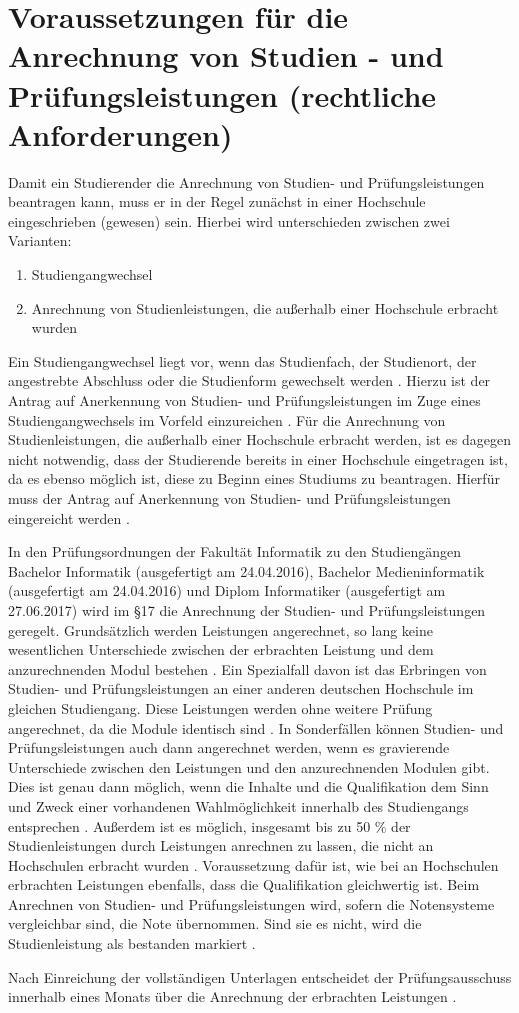 \section{Voraussetzungen für die Anrechnung von Studien - und Prüfungsleistungen (rechtliche Anforderungen)}

Damit ein Studierender die Anrechnung von Studien- und Prüfungsleistungen beantragen kann, muss er in der Regel zunächst in einer Hochschule eingeschrieben (gewesen) sein. Hierbei wird unterschieden zwischen zwei Varianten:

\begin{enumerate}
\item Studiengangwechsel
\item Anrechnung von Studienleistungen, die außerhalb einer Hochschule erbracht wurden
\end{enumerate}


Ein Studiengangwechsel liegt vor, wenn das Studienfach, der Studienort, der angestrebte Abschluss oder die Studienform gewechselt werden \parencite{studiengangwechsel}. Hierzu ist der Antrag auf Anerkennung von Studien- und Prüfungsleistungen im Zuge eines Studiengangwechsels im Vorfeld einzureichen \parencite{antrag_anrechnung_wechsel}.
Für die Anrechnung von Studienleistungen, die außerhalb einer Hochschule erbracht werden, ist es dagegen nicht notwendig, dass der Studierende bereits in einer Hochschule eingetragen ist, da es ebenso möglich ist, diese zu Beginn eines Studiums zu beantragen. Hierfür muss der Antrag auf Anerkennung von Studien- und Prüfungsleistungen eingereicht werden \parencite{antrag_anrechnung}.

In den Prüfungsordnungen der Fakultät Informatik zu den Studiengängen Bachelor Informatik (ausgefertigt am 24.04.2016), Bachelor Medieninformatik (ausgefertigt am 24.04.2016) und Diplom Informatiker (ausgefertigt am 27.06.2017) wird im §17 die Anrechnung der Studien- und Prüfungsleistungen geregelt.
Grundsätzlich werden Leistungen angerechnet, so lang keine wesentlichen Unterschiede zwischen der erbrachten Leistung und dem anzurechnenden Modul bestehen \parencite{pruefungsordnung_ba}. Ein Spezialfall davon ist das Erbringen von Studien- und Prüfungsleistungen an einer anderen deutschen Hochschule im gleichen Studiengang. Diese Leistungen werden ohne weitere Prüfung angerechnet, da die Module identisch sind \parencite{pruefungsordnung_ba}. In Sonderfällen können Studien- und Prüfungsleistungen auch dann angerechnet werden, wenn es gravierende Unterschiede zwischen den Leistungen und den anzurechnenden Modulen gibt. Dies ist genau dann möglich, wenn die Inhalte und die Qualifikation dem Sinn und Zweck einer vorhandenen Wahlmöglichkeit innerhalb des Studiengangs entsprechen \parencite{pruefungsordnung_ba}.
Außerdem ist es möglich, insgesamt bis zu 50 \% der Studienleistungen durch Leistungen anrechnen zu lassen, die nicht an Hochschulen erbracht wurden \parencite{pruefungsordnung_ba}. Voraussetzung dafür ist, wie bei an Hochschulen erbrachten Leistungen ebenfalls, dass die Qualifikation gleichwertig ist.
Beim Anrechnen von Studien- und Prüfungsleistungen wird, sofern die Notensysteme vergleichbar sind, die Note übernommen. Sind sie es nicht, wird die Studienleistung als bestanden markiert \parencite{pruefungsordnung_ba}.

Nach Einreichung der vollständigen Unterlagen entscheidet der Prüfungsausschuss innerhalb eines Monats über die Anrechnung der erbrachten Leistungen \parencite{pruefungsordnung_ba}.
